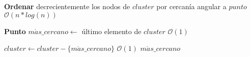 \begin{algorithm}[H]
\caption{\Comment $\mathcal{O}(n*log(n))$}
\begin{algorithmic}[1]
	\State \textbf{Ordenar} decrecientemente los nodos de $cluster$ por cercanía angular a $punto$
	\Comment $\mathcal{O}(n*log(n))$

	\State \textbf{Punto} $m\acute{a}s\_cercano \gets$ último elemento de $cluster$
	\Comment $\mathcal{O}(1)$

	\State $cluster \gets cluster - \{m\acute{a}s\_cercano\}$
	\Comment $\mathcal{O}(1)$
	\Statex
	\State \Return $m\acute{a}s\_cercano$
\EndFunction
\end{algorithmic}
\end{algorithm}